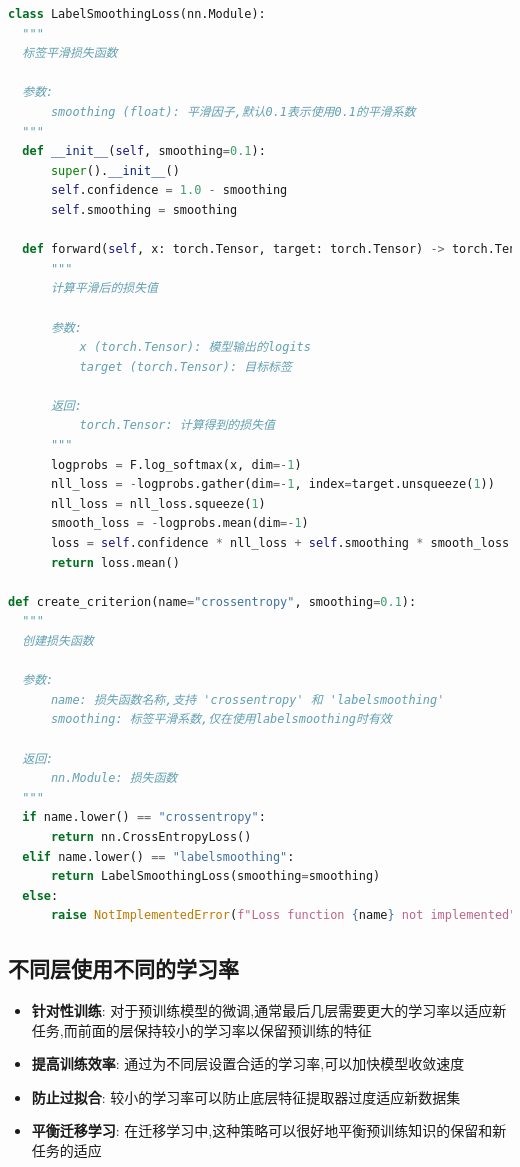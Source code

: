 \documentclass[12pt,a4paper,UTF8]{article}
\begin{document}
\begin{lstlisting}[language=Python, caption=增加label smoothing]
  class LabelSmoothingLoss(nn.Module):
  """
  标签平滑损失函数
  
  参数:
      smoothing (float): 平滑因子,默认0.1表示使用0.1的平滑系数
  """
  def __init__(self, smoothing=0.1):
      super().__init__()
      self.confidence = 1.0 - smoothing
      self.smoothing = smoothing

  def forward(self, x: torch.Tensor, target: torch.Tensor) -> torch.Tensor:
      """
      计算平滑后的损失值
      
      参数:
          x (torch.Tensor): 模型输出的logits
          target (torch.Tensor): 目标标签
          
      返回:
          torch.Tensor: 计算得到的损失值
      """
      logprobs = F.log_softmax(x, dim=-1)
      nll_loss = -logprobs.gather(dim=-1, index=target.unsqueeze(1))
      nll_loss = nll_loss.squeeze(1)
      smooth_loss = -logprobs.mean(dim=-1)
      loss = self.confidence * nll_loss + self.smoothing * smooth_loss
      return loss.mean()

def create_criterion(name="crossentropy", smoothing=0.1):
  """
  创建损失函数
  
  参数:
      name: 损失函数名称,支持 'crossentropy' 和 'labelsmoothing'
      smoothing: 标签平滑系数,仅在使用labelsmoothing时有效
      
  返回:
      nn.Module: 损失函数
  """
  if name.lower() == "crossentropy":
      return nn.CrossEntropyLoss()
  elif name.lower() == "labelsmoothing":
      return LabelSmoothingLoss(smoothing=smoothing)
  else:
      raise NotImplementedError(f"Loss function {name} not implemented")
\end{lstlisting}
\subsection{不同层使用不同的学习率}


\begin{itemize}
    \item \textbf{针对性训练}: 对于预训练模型的微调,通常最后几层需要更大的学习率以适应新任务,而前面的层保持较小的学习率以保留预训练的特征
    \item \textbf{提高训练效率}: 通过为不同层设置合适的学习率,可以加快模型收敛速度
    \item \textbf{防止过拟合}: 较小的学习率可以防止底层特征提取器过度适应新数据集
    \item \textbf{平衡迁移学习}: 在迁移学习中,这种策略可以很好地平衡预训练知识的保留和新任务的适应
\end{itemize}
\end{document}
